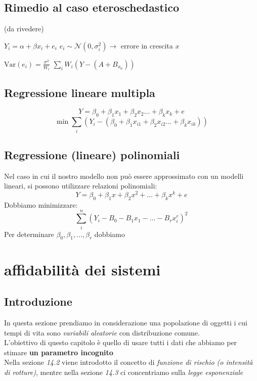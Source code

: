 \documentclass[]{article}
\begin{document}
    \subsection{Rimedio al caso eteroschedastico}\label{sec:rimedio-al-caso-eteroschedastico}
    (da rivedere)
    
    $Y_i = \alpha + \beta x_i + e_i$
    $e_i \sim \mathcal N(0,\sigma_i^2) \rightarrow$ errore in crescita $x$
    
    $\text{Var}(e_i) = \frac{\sigma^2}{W_i}$
    $\sum_i W_i(Y-(A+B_{x_0}))$
    \subsection{Regressione lineare multipla}\label{sec:regressione-lineare-multipla}
    \[ Y = \beta_0 + \beta_1 x_1 + \beta_2 x_2 \ldots + \beta_k x_k +e \]
    \[ \min\sum_i(Y_i -(\beta_0+\beta_1x_{i1} + \beta_2x_{i2} \ldots + \beta_kx_{ik})) \]
    \subsection{Regressione (lineare) polinomiali}\label{sec:regressione-lineare-polinomiali}
    Nel caso in cui il nostro modello non può essere approssimato con un modelli lineari, si possono utilizzare relazioni polinomiali:
    \[ Y = \beta_0 + \beta_1x+\beta_2x^2 +\ldots+\beta_kx^k + e \]
    Dobbiamo minimizzare:
    \[ \sum_i^n (Y_i-B_0-B_1x_1-\ldots-B_rx_i^r)^2 \]
    Per determinare $\beta_0, \beta_1, \ldots, \beta_r$ dobbiamo
    \section{affidabilità dei sistemi}
    \subsection{Introduzione}
    In questa sezione prendiamo in considerazione una popolazione di oggetti i cui tempi di vita sono \textit{variabili aleatorie} con distribuzione comune. \\
    L'obiettivo di questo capitolo è quello di usare tutti i dati che abbiamo per stimare \textbf{un parametro incognito} \\
    Nella sezione \textit{14.2} viene introdotto il concetto di \textit{funzione di rischio (o intensità di rotture)}, mentre nella sezione \textit{14.3} ci concentriamo sulla \textit{legge esponenziale}
\end{document}
